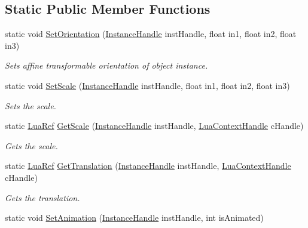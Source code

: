 \subsection*{Static Public Member Functions}
\begin{DoxyCompactItemize}
\item 
static void \hyperlink{class_object_instance_a_p_i_a090217643e7072b0810a2ef59c7e273c}{Set\+Orientation} (\hyperlink{_lua_object_instance_manager_8h_a317edebd09c13058779c942342947a0d}{Instance\+Handle} inst\+Handle, float in1, float in2, float in3)
\begin{DoxyCompactList}\small\item\em Sets affine transformable orientation of object instance. \end{DoxyCompactList}\item 
static void \hyperlink{class_object_instance_a_p_i_acb44a666e4f0568015f5f2d59e379808}{Set\+Scale} (\hyperlink{_lua_object_instance_manager_8h_a317edebd09c13058779c942342947a0d}{Instance\+Handle} inst\+Handle, float in1, float in2, float in3)
\begin{DoxyCompactList}\small\item\em Sets the scale. \end{DoxyCompactList}\item 
static \hyperlink{_lua_context_8h_a2220f03700ba40e366f0ee2d684d5c91}{Lua\+Ref} \hyperlink{class_object_instance_a_p_i_a3593719302d43337d488182e7fe6fd12}{Get\+Scale} (\hyperlink{_lua_object_instance_manager_8h_a317edebd09c13058779c942342947a0d}{Instance\+Handle} inst\+Handle, \hyperlink{_lua_context_8h_a2ffcc2d3ed21165072a1d7b61259bf14}{Lua\+Context\+Handle} c\+Handle)
\begin{DoxyCompactList}\small\item\em Gets the scale. \end{DoxyCompactList}\item 
static \hyperlink{_lua_context_8h_a2220f03700ba40e366f0ee2d684d5c91}{Lua\+Ref} \hyperlink{class_object_instance_a_p_i_a7b2c11754d2679e27221691238becdd4}{Get\+Translation} (\hyperlink{_lua_object_instance_manager_8h_a317edebd09c13058779c942342947a0d}{Instance\+Handle} inst\+Handle, \hyperlink{_lua_context_8h_a2ffcc2d3ed21165072a1d7b61259bf14}{Lua\+Context\+Handle} c\+Handle)
\begin{DoxyCompactList}\small\item\em Gets the translation. \end{DoxyCompactList}\item 
static void \hyperlink{class_object_instance_a_p_i_a8004b94256b3aea6c56588c8288be4e2}{Set\+Animation} (\hyperlink{_lua_object_instance_manager_8h_a317edebd09c13058779c942342947a0d}{Instance\+Handle} inst\+Handle, int is\+Animated)

\end{DoxyCompactItemize}
